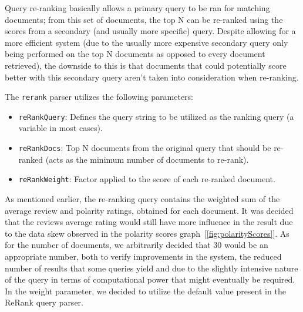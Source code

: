 \documentclass[sigconf]{acmart}
\begin{document}
Query re-ranking basically allows a primary query to be ran for matching documents; from this set of documents, the top N can be re-ranked using the scores from a secondary (and usually more specific) query. Despite allowing for a more efficient system (due to the usually more expensive secondary query only being performed on the top N documents as opposed to every document retrieved), the downside to this is that documents that could potentially score better with this secondary query aren't taken into consideration when re-ranking.

The \texttt{rerank} parser utilizes the following parameters:

\begin{itemize}
    \item \texttt{reRankQuery}: Defines the query string to be utilized as the ranking query (a variable in most cases).
    \item \texttt{reRankDocs}: Top N documents from the original query that should be re-ranked (acts as the minimum number of documents to re-rank).
    \item \texttt{reRankWeight}: Factor applied to the score of each re-ranked document.
\end{itemize}

As mentioned earlier, the re-ranking query contains the weighted sum of the average review and polarity ratings, obtained for each document. It was decided that the reviews average rating would still have more influence in the result due to the data skew observed in the polarity scores graph~[\ref{fig:polarityScores}]. As for the number of documents, we arbitrarily decided that 30 would be an appropriate number, both to verify improvements in the system, the reduced number of results that some queries yield and due to the slightly intensive nature of the query in terms of computational power that might eventually be required. In the weight parameter, we decided to utilize the default value present in the ReRank query parser.

\begin{table}[H]
    \caption{ReRank Query Parser Fields}
    \label{tab:rerank_parser}
\end{table}
\end{document}
